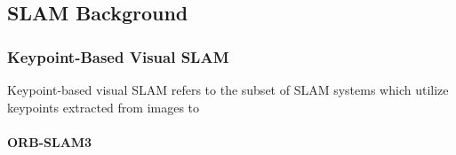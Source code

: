 \subsection{SLAM Background}

\subsubsection{Keypoint-Based Visual SLAM}

Keypoint-based visual SLAM refers to the subset of SLAM systems which utilize keypoints extracted from images to



\paragraph{ORB-SLAM3}
